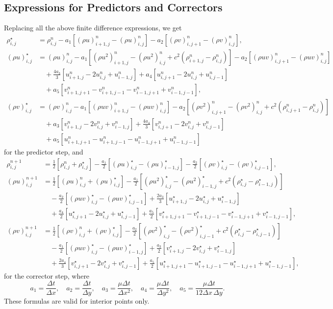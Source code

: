 \documentclass[11pt]{article}
\newcommand{\ind}[4]{{#1}^{#2}_{#3,#4}}
\newcommand{\fDx}[4]{\ind{#1}{#2}{#3+1}{#4} - \ind{#1}{#2}{#3}{#4}}
\newcommand{\bDx}[4]{\ind{#1}{#2}{#3}{#4} - \ind{#1}{#2}{#3-1}{#4}}
\newcommand{\fDy}[4]{\ind{#1}{#2}{#3}{#4+1} - \ind{#1}{#2}{#3}{#4}}
\newcommand{\bDy}[4]{\ind{#1}{#2}{#3}{#4} - \ind{#1}{#2}{#3}{#4-1}}
\newcommand{\cDxx}[4]{\ind{#1}{#2}{#3+1}{#4} - 2\ind{#1}{#2}{#3}{#4} + \ind{#1}{#2}{#3-1}{#4}}
\newcommand{\cDyy}[4]{\ind{#1}{#2}{#3}{#4+1} - 2\ind{#1}{#2}{#3}{#4} + \ind{#1}{#2}{#3}{#4-1}}
\newcommand{\cDxy}[4]{\ind{#1}{#2}{#3+1}{#4+1} - \ind{#1}{#2}{#3+1}{#4-1} - \ind{#1}{#2}{#3-1}{#4+1} + \ind{#1}{#2}{#3-1}{#4-1}}
\begin{document}
\subsection{Expressions for Predictors and Correctors}

Replacing all the above finite difference expressions, we get
\begin{align}
\ind{\rho}{\star}{i}{j} &= \ind{\rho}{n}{i}{j} - a_1\left[ \fDx{(\rho u)}{n}{i}{j}\right] - a_2\left[ \fDy{(\rho v)}{n}{i}{j}\right],\\
\ind{(\rho u)}{\star}{i}{j} &= \ind{(\rho u)}{n}{i}{j} - a_1\left[ \fDx{(\rho u^2)}{n}{i}{j} + c^2\left(\fDx{\rho}{n}{i}{j}\right) \right] - a_2\left[ \fDy{(\rho u v)}{n}{i}{j} \right]\\
&\quad + \frac{4a_3}{3}\left[ \cDxx{u}{n}{i}{j} \right] + a_4\left[ \cDyy{u}{n}{i}{j} \right]\\
&\quad + a_5\left[ \cDxy{v}{n}{i}{j} \right],\\
\ind{(\rho v)}{\star}{i}{j} &= \ind{(\rho v)}{n}{i}{j} - a_1\left[ \fDx{(\rho u v)}{n}{i}{j} \right]- a_2\left[ \fDy{(\rho v^2)}{n}{i}{j} + c^2\left(\fDy{\rho}{n}{i}{j}\right) \right]\\
&\quad + a_3\left[ \cDxx{v}{n}{i}{j} \right] + \frac{4a_4}{3}\left[ \cDyy{v}{n}{i}{j} \right]\\
&\quad + a_5\left[ \cDxy{u}{n}{i}{j} \right]
\end{align}
for the predictor step, and
\begin{align}
\ind{\rho}{n+1}{i}{j} &= \frac{1}{2}\left[ \ind{\rho}{n}{i}{j} + \ind{\rho}{\star}{i}{j}\right] - \frac{a_1}{2}\left[ \bDx{(\rho u)}{\star}{i}{j}\right] - \frac{a_2}{2}\left[ \bDy{(\rho v)}{\star}{i}{j}\right],\\
\ind{(\rho u)}{n+1}{i}{j} &= \frac{1}{2}\left[ \ind{(\rho u)}{n}{i}{j} + \ind{(\rho u)}{\star}{i}{j} \right] - \frac{a_1}{2}\left[ \bDx{(\rho u^2)}{\star}{i}{j} + c^2\left(\bDx{\rho}{\star}{i}{j}\right) \right]\\
&\quad - \frac{a_2}{2}\left[ \bDy{(\rho u v)}{\star}{i}{j} \right] + \frac{2a_3}{3}\left[ \cDxx{u}{\star}{i}{j} \right]\\
&\quad + \frac{a_4}{2}\left[ \cDyy{u}{\star}{i}{j} \right] + \frac{a_5}{2}\left[ \cDxy{v}{\star}{i}{j} \right],\\
\ind{(\rho v)}{n+1}{i}{j} &= \frac{1}{2}\left[ \ind{(\rho v)}{n}{i}{j} + \ind{(\rho v)}{\star}{i}{j} \right] - \frac{a_2}{2}\left[ \bDy{(\rho v^2)}{\star}{i}{j} + c^2\left(\bDy{\rho}{\star}{i}{j}\right) \right]\\
&\quad - \frac{a_1}{2}\left[\bDx{(\rho u v)}{\star}{i}{j}\right] + \frac{a_3}{2}\left[ \cDxx{v}{\star}{i}{j} \right]\\
&\quad + \frac{2a_4}{3}\left[ \cDyy{v}{\star}{i}{j} \right] + \frac{a_5}{2}\left[ \cDxy{u}{\star}{i}{j} \right],
\end{align}
for the corrector step, where
\begin{equation}
a_1 = \frac{\Delta t}{\Delta x},\quad a_2 = \frac{\Delta t}{\Delta y},\quad a_3 = \frac{\mu\Delta t}{\Delta x^2},\quad a_4 = \frac{\mu\Delta t}{\Delta y^2},\quad a_5 = \frac{\mu\Delta t}{12\Delta x\,\Delta y}.
\end{equation}
These formulas are valid for interior points only. 
\end{document}
